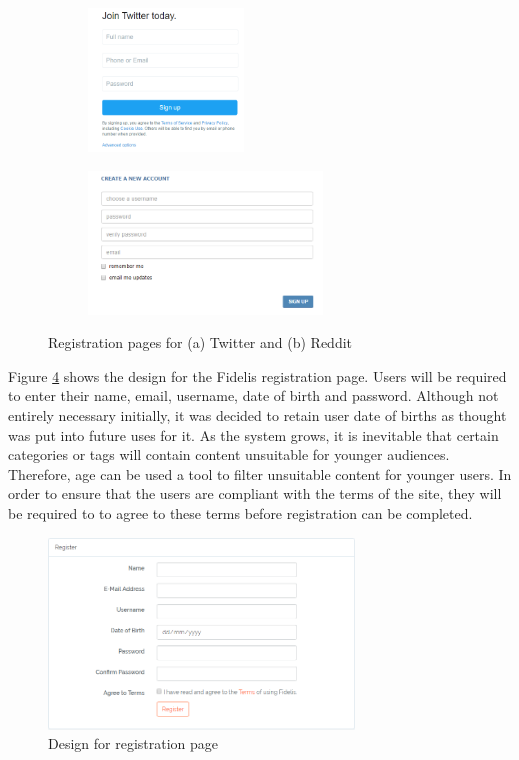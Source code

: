 \begin{figure}[H]
\centering
\begin{subfigure}[b]{.4\linewidth}
	\includegraphics[height=1.5in]{Images/Design/twitter-reg}
	\caption{}
	\label{fig:twitter-reg}
\end{subfigure}
\begin{subfigure}[b]{.5\linewidth}
	\centering
	\includegraphics[height=1.5in]{Images/Design/reddit-reg}
	\caption{}
	\label{fig:reddit-reg}
\end{subfigure}
\caption{Registration pages for (a) Twitter and (b) Reddit}
\label{fig:reg-pages}
\end{figure}

Figure \ref{fig:register-page} shows the design for the Fidelis registration page. Users will be required to enter their name, email, username, date of birth and password. Although not entirely necessary initially, it was decided to retain user date of births as thought was put into future uses for it. As the system grows, it is inevitable that certain categories or tags will contain content unsuitable for younger audiences. Therefore, age can be used a tool to filter unsuitable content for younger users. In order to ensure that the users are compliant with the terms of the site, they will be required to to agree to these terms before registration can be completed.

\begin{figure}[H]
\centering
\includegraphics[height=2in]{Images/Design/register-page}
\caption{Design for registration page}
\label{fig:register-page}
\end{figure}

